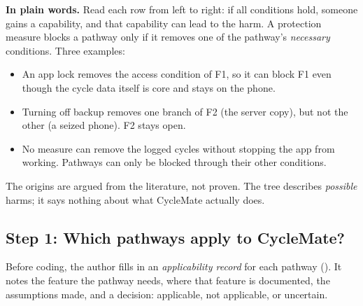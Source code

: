 \noindent\textbf{In plain words.} Read each row from left to right: if all
conditions hold, someone gains a capability, and that capability can lead to
the harm. A protection measure blocks a pathway only if it removes one of the
pathway's \emph{necessary} conditions. Three examples:
\begin{itemize}
  \item An app lock removes the access condition of F1, so it can block F1
    even though the cycle data itself is core and stays on the phone.
  \item Turning off backup removes one branch of F2 (the server copy), but
    not the other (a seized phone). F2 stays open.
  \item No measure can remove the logged cycles without stopping the app from
    working. Pathways can only be blocked through their other conditions.
\end{itemize}
The origins are argued from the literature, not proven. The tree describes
\emph{possible} harms; it says nothing about what CycleMate actually does.

\subsection*{Step 1: Which pathways apply to CycleMate?}

Before coding, the author fills in an \emph{applicability record} for each
pathway (). It notes the feature the pathway needs,
where that feature is documented, the assumptions made, and a decision:
applicable, not applicable, or uncertain.

